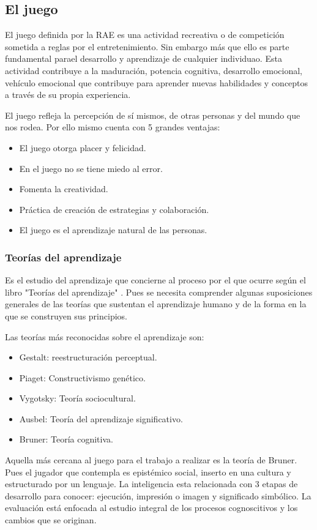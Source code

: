 \subsection{El juego}\label{juego}
El juego definida por la RAE es una actividad  recreativa o de competición sometida a reglas por el entretenimiento. Sin embargo más que ello es parte fundamental parael desarrollo y aprendizaje de cualquier individuao. Esta actividad contribuye a la maduración, potencia cognitiva, desarrollo emocional, vehículo emocional que contribuye para aprender nuevas habilidades y conceptos a través de su propia experiencia.

El juego refleja la percepción de sí mismos, de otras personas y del mundo que nos rodea. Por ello mismo cuenta con 5 grandes ventajas:
\begin{itemize}
	\item El juego otorga placer y felicidad.
	\item En el juego no se tiene miedo al error.
	\item Fomenta la creatividad.
	\item Práctica de creación de estrategias y colaboración.
	\item El juego es el aprendizaje natural de las personas.
\end{itemize}
	
\subsubsection{Teorías del aprendizaje}
Es el estudio del aprendizaje que concierne al proceso por el que ocurre según el libro "Teorías del aprendizaje" \cite{libroTeoApr}. Pues se necesita comprender algunas suposiciones generales de las teorías que sustentan el aprendizaje humano y de la forma en la que se construyen sus principios.

Las teorías más reconocidas sobre el aprendizaje son:
\begin{itemize}
	\item Gestalt: reestructuración perceptual.
	\item Piaget: Constructivismo genético.
	\item Vygotsky: Teoría sociocultural.
	\item Ausbel: Teoría del aprendizaje significativo.
	\item Bruner: Teoría cognitiva.
\end{itemize}

Aquella más cercana al juego para el trabajo a realizar es la teoría de Bruner. Pues el jugador que contempla es epistémico social, inserto en una cultura y estructurado por un lenguaje. La inteligencia esta relacionada con 3 etapas de desarrollo para conocer: ejecución, impresión o imagen y significado simbólico. La evaluación está enfocada al estudio integral de los procesos cognoscitivos y los cambios que se originan.


